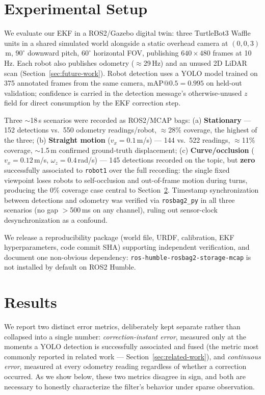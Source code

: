 \documentclass[runningheads]{llncs}
\begin{document}
\section{Experimental Setup}
\label{sec:experimental-setup}

We evaluate our EKF in a ROS2/Gazebo digital twin: three TurtleBot3
Waffle units in a shared simulated world alongside a static overhead
camera at $(0,0,3)$\,m, $90^\circ$ downward pitch, $60^\circ$ horizontal
FOV, publishing $640\times480$ frames at 10\,Hz. Each robot also
publishes odometry ($\approx$29\,Hz) and an unused 2D LiDAR scan
(Section~\ref{sec:future-work}). Robot detection uses a YOLO model
trained on 375 annotated frames from the same camera,
$\mathrm{mAP@0.5}=0.995$ on held-out validation; confidence is carried
in the detection message's otherwise-unused $z$ field for direct
consumption by the EKF correction step.

Three $\sim$18\,s scenarios were recorded as ROS2/MCAP bags: (a)
\textbf{Stationary} — 152 detections vs.\ 550 odometry readings/robot,
$\approx$28\% coverage, the highest of the three; (b) \textbf{Straight
motion} ($v_x=0.1$\,m/s) — 144 vs.\ 522 readings, $\approx$11\%
coverage, $\sim$1.5\,m confirmed ground-truth displacement; (c)
\textbf{Curve/occlusion} ($v_x=0.12$\,m/s, $\omega_z=0.4$\,rad/s) — 145
detections recorded on the topic, but \textbf{zero} successfully
associated to \texttt{robot1} over the full recording: the single fixed
viewpoint loses robots to self-occlusion and out-of-frame motion during
turns, producing the 0\% coverage case central to
Section~\ref{sec:results}. Timestamp synchronization between detections
and odometry was verified via \texttt{rosbag2\_py} in all three
scenarios (no gap $>$500\,ms on any channel), ruling out sensor-clock
desynchronization as a confound.

We release a reproducibility package (world file, URDF, calibration,
EKF hyperparameters, code commit SHA) supporting independent
verification, and document one non-obvious dependency:
\texttt{ros-humble-rosbag2-storage-mcap} is not installed by default on
ROS2 Humble.

\section{Results}
\label{sec:results}

We report two distinct error metrics, deliberately kept separate rather
than collapsed into a single number: \emph{correction-instant error},
measured only at the moments a YOLO detection is successfully associated
and fused (the metric most commonly reported in related
work — Section~\ref{sec:related-work}), and \emph{continuous error},
measured at every odometry reading regardless of whether a correction
occurred. As we show below, these two metrics disagree in sign, and both
are necessary to honestly characterize the filter's behavior under
sparse observation.
\end{document}
